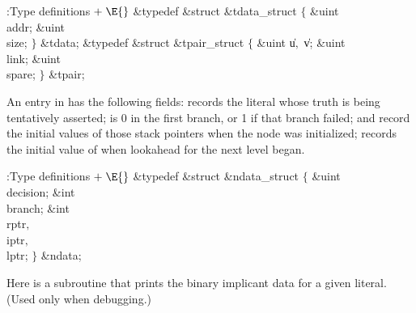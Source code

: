 \Y\B\4:Type definitions\X${}\mathrel+\E{}$\6
\&{typedef} \&{struct} \&{tdata\_struct} ${}\{{}$\1\6
\&{uint} \\{addr};\6
\&{uint} \\{size};\2\6
${}\}{}$ \&{tdata};\6
\&{typedef} \&{struct} \&{tpair\_struct} ${}\{{}$\1\6
\&{uint} \|u${},{}$ \|v;\6
\&{uint} \\{link};\6
\&{uint} \\{spare};\2\6
${}\}{}$ \&{tpair};\par
\fi

An entry in  has the following fields:
 records the literal whose truth is being tentatively
asserted;
 is 0 in the first branch, or 1 if that branch failed;
 and  record the initial values of those stack
pointers
when the node was initialized;
 records the initial value of  when lookahead for the
next level began.

\Y\B\4:Type definitions\X${}\mathrel+\E{}$\6
\&{typedef} \&{struct} \&{ndata\_struct} ${}\{{}$\1\6
\&{uint} \\{decision};\6
\&{int} \\{branch};\6
\&{int} \\{rptr}${},{}$ \\{iptr}${},{}$ \\{lptr};\2\6
${}\}{}$ \&{ndata};\par
\fi

Here is a subroutine that prints the binary implicant data for
a given literal. (Used only when debugging.)

